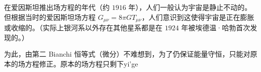 

在爱因斯坦推出场方程的年代（约 $1916$ 年），人们一般认为宇宙是静止不动的。但根据当时的爱因斯坦场方程 $ G_{\mu \nu} = 8 \pi G  T_{\mu \nu}$，人们意识到这使得宇宙是正在膨胀或收缩的。（实际上银河系以外存在其他星系都是在 $1924$ 年被埃德温·哈勃首次发现的。）

为此，由第二 Bianchi 恒等式（微分）不难想到，为了仍保证能量守恒，只能对原本的场方程修正。原本的场方程只剩下yi'ge